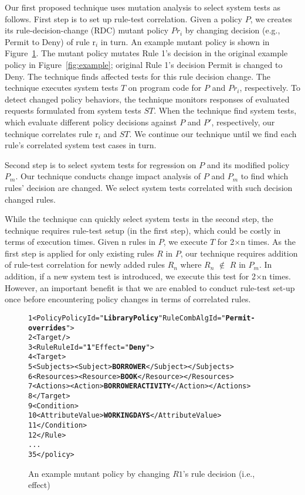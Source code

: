 Our first proposed technique uses mutation analysis to select system tests as follows.
First step is to set up rule-test correlation.
Given a policy $P$, we creates its rule-decision-change (RDC) mutant policy $Pr_i$ by changing decision (e.g., Permit to Deny) of rule r$_i$ in turn. An example mutant policy is shown in Figure~\ref{fig:rdcexample}. The mutant policy mutates Rule 1's decision in the original example policy in Figure~\ref{fig:example}; original Rule 1's decision Permit is changed to Deny. The technique finds affected tests for this rule decision change. 
The technique executes system tests $T$ on program code for $P$ and $Pr_i$, respectively. To detect changed policy behaviors, the technique monitors responses of evaluated requests formulated from system tests $ST$. When the technique find system tests, which evaluate different policy decisions against $P$ and $P'$, respectively, our technique 
correlates rule r$_i$ and $ST$.
We continue our technique until we find each rule's correlated system test cases in turn.

Second step is to select system tests for regression on $P$ and its modified policy $P_m$.
Our technique conducts change impact analysis of $P$ and $P_m$ to find which rules' decision are changed.
We select system tests correlated with such decision changed rules.

While the technique can quickly select system tests in the second step, the technique requires rule-test setup (in the first step), which could be costly in terms of execution times. Given n rules in $P$, we execute $T$ for 2$\times$n times. 
As the first step is applied for only existing rules $R$ in $P$, our technique requires addition of rule-test
correlation for newly added rules $R_n$ where $R_n$ $\notin$ $R$ in $P_m$. 
In addition, if a new system test is introduced, we execute this test for 2$\times$n times.
However, an important benefit is that we are enabled to conduct rule-test set-up once before encountering policy changes in terms of correlated rules. 

\begin{figure}[t]%
\begin{CodeOut}
\begin{alltt}
 1 <Policy PolicyId="\textbf{Library Policy}" RuleCombAlgId="\textbf{Permit-overrides}">
 2  <Target/>
 3    <Rule RuleId="\textbf{1}" Effect="\textbf{Deny}">
 4      <Target>
 5        <Subjects><Subject> \textbf{BORROWER} </Subject></Subjects>
 6        <Resources><Resource> \textbf{BOOK} </Resource></Resources>
 7        <Actions><Action> \textbf{BORROWERACTIVITY} </Action></Actions>
 8      </Target>
 9	    <Condition>
10        <AttributeValue> \textbf{WORKINGDAYS} </AttributeValue>
11      </Condition>
12    </Rule>
...
35 </policy>
\end{alltt}
\end{CodeOut}
\vspace*{-3.0ex} \caption{An example mutant policy by changing $R1$'s rule decision (i.e., effect)}
 \label{fig:rdcexample}
\end{figure}


